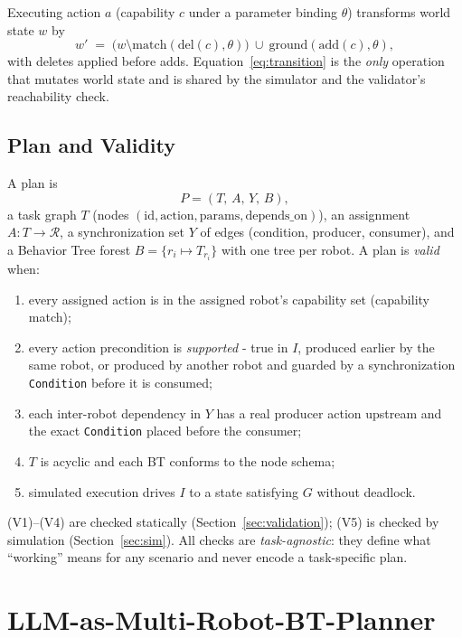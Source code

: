 \documentclass[journal]{IEEEtran}
\newcommand{\pred}[1]{\texttt{#1}}
\begin{document}
Executing action $a$ (capability $c$ under a parameter binding $\theta$) transforms world state $w$ by
\begin{equation}
    \label{eq:transition}
    w' \;=\; \big(w \setminus \mathrm{match}(\mathrm{del}(c),\theta)\big)\ \cup\ \mathrm{ground}(\mathrm{add}(c),\theta),
\end{equation}
with deletes applied before adds. Equation~\eqref{eq:transition} is the \emph{only} operation that mutates world state and is shared by the simulator and the validator's reachability check.

\subsection{Plan and Validity}
A plan is
\begin{equation}
    P = (T,\, A,\, Y,\, B),
\end{equation}
a task graph $T$ (nodes $(\text{id},\text{action},\text{params},\text{depends\_on})$), an assignment $A:T\!\to\!\mathcal{R}$, a synchronization set $Y$ of edges (condition, producer, consumer), and a Behavior Tree forest $B=\{r_i \mapsto T_{r_i}\}$ with one tree per robot. A plan is \emph{valid} when:
\begin{enumerate}
    \item[(V1)] every assigned action is in the assigned robot's capability set (capability match);
    \item[(V2)] every action precondition is \emph{supported} - true in $I$, produced earlier by the same robot, or produced by another robot and guarded by a synchronization \pred{Condition} before it is consumed;
    \item[(V3)] each inter-robot dependency in $Y$ has a real producer action upstream and the exact \pred{Condition} placed before the consumer;
    \item[(V4)] $T$ is acyclic and each BT conforms to the node schema;
    \item[(V5)] simulated execution drives $I$ to a state satisfying $G$ without deadlock.
\end{enumerate}
(V1)--(V4) are checked statically (Section~\ref{sec:validation}); (V5) is checked by simulation (Section~\ref{sec:sim}). All checks are \emph{task-agnostic}: they define what ``working'' means for any scenario and never encode a task-specific plan.

\section{LLM-as-Multi-Robot-BT-Planner}
\label{sec:framework}
\end{document}
